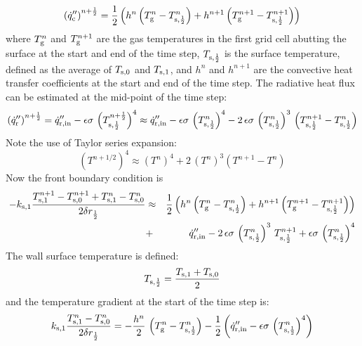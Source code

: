 \begin{equation}
\label{conv}
  \left( \dot{q}_{\rm c}'' \right)^{n+\frac{1}{2}} = \frac{1}{2} \left( h^n \left(T_{\rm g}^n - T_{\rm s,\frac{1}{2}}^n\right) + h^{n+1} \left(T_{\rm g}^{n+1} - T_{\rm s,\frac{1}{2}}^{n+1} \right) \right)
\end{equation}
where $T_{\rm g}^n$ and $T_{\rm g}^{n+1}$ are the gas temperatures in the first grid cell abutting the surface at the start and end of the time step, $T_{\rm s,\frac{1}{2}}$ is the surface temperature, defined as the average of $T_{\rm s,0}$ and $T_{\rm s,1}$, and $h^n$ and $h^{n+1}$ are the convective heat transfer coefficients at the start and end of the time step. The radiative heat flux can be estimated at the mid-point of the time step:
\begin{equation}
\label{radi}
\left( \dot{q}_{\rm r}'' \right)^{n+\frac{1}{2}} = \dot{q}_{\rm r, in}'' - \epsilon \sigma \, \left( T_{\rm s,\frac{1}{2}}^{n+\frac{1}{2}} \right)^4
  \approx \dot{q}_{\rm r, in}'' - \epsilon \sigma \, \left( T_{\rm s,\frac{1}{2}}^n \right)^4 - 2 \, \epsilon\sigma \, \left( T_{\rm s,\frac{1}{2}}^n \right)^3 \, \left( T_{\rm s,\frac{1}{2}}^{n+1}-T_{\rm s,\frac{1}{2}}^n \right)
\end{equation}
Note the use of Taylor series expansion:
\begin{equation}
\label{T_taylor}
(T^{n+1/2})^4 \approx (T^n)^4 + 2 \, (T^n)^3 (T^{n+1}-T^n)
\end{equation}
Now the front boundary condition is
\begin{eqnarray}
\label{bc_front_2}
  -k_{\rm s,1} \frac{T_{\rm s,1}^{n+1}-T_{\rm s,0}^{n+1} + T_{\rm s,1}^{n}-T_{\rm s,0}^{n}}{2 \delta r_{\frac{1}{2}}}
  &\approx& \frac{1}{2} \left( h^n \left(T_{\rm g}^n - T_{\rm s,\frac{1}{2}}^n\right) + h^{n+1} \left(T_{\rm g}^{n+1} - T_{\rm s,\frac{1}{2}}^{n+1} \right) \right) \nonumber \\ &+&
  \dot{q}_{\rm r, in}'' - 2 \, \epsilon\sigma \, \left(T_{\rm s,\frac{1}{2}}^n \right)^3 \, T_{\rm s,\frac{1}{2}}^{n+1} +  \epsilon\sigma \, \left( T_{\rm s,\frac{1}{2}}^n \right)^4
\end{eqnarray}
The wall surface temperature is defined:
\begin{equation}
\label{T_front}
  T_{\rm s,\frac{1}{2}} = \frac{T_{\rm s,1}+T_{\rm s,0}}{2}
\end{equation}
and the temperature gradient at the start of the time step is:
\begin{equation}
k_{\rm s,1} \frac{T_{\rm s,1}^{n}-T_{\rm s,0}^{n}}{2 \delta r_{\frac{1}{2}}} = -\frac{h^n}{2} \, \left( T_{\rm g}^n - T_{\rm s,\frac{1}{2}}^n \right) - \frac{1}{2} \left( \dot{q}_{\rm r, in}'' - \epsilon \sigma \, \left( T_{\rm s,\frac{1}{2}}^{n} \right)^4 \right)
\end{equation}
